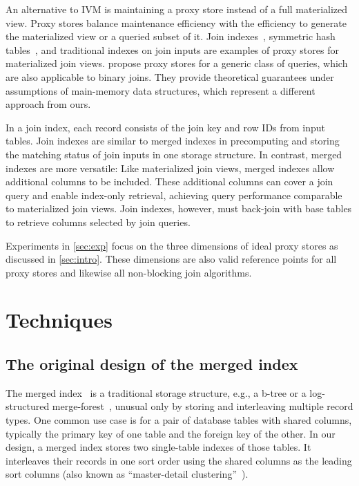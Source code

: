\documentclass[biblatex, english]{lni}
\begin{document}
An alternative to IVM is maintaining a proxy store instead of a full materialized view.
Proxy stores balance maintenance efficiency with the efficiency to generate the materialized view or a queried subset of it.
Join indexes~\cite{oneil1995joinindex,valduriez87joinindex}, symmetric hash tables~\cite{wilschut1991shj, hong1993shj, Urhan2000XJoinAR, lawrence2005early}, and traditional indexes on join inputs are examples of proxy stores for materialized join views.
 propose proxy stores for a generic class of queries, which are also applicable to binary joins.
They provide theoretical guarantees under assumptions of main-memory data structures, which represent a different approach from ours.

In a join index, each record consists of the join key and row IDs from input tables.
Join indexes are similar to merged indexes in precomputing and storing the matching status of join inputs in one storage structure.
In contrast, merged indexes are more versatile:
Like materialized join views, merged indexes allow additional columns to be included.
These additional columns can cover a join query and enable index-only retrieval, achieving query performance comparable to materialized join views.
Join indexes, however, must back-join with base tables to retrieve columns selected by join queries.

Experiments in \cref{sec:exp} focus on the three dimensions of ideal proxy stores as discussed in \cref{sec:intro}.
These dimensions are also valid reference points for all proxy stores and likewise all non-blocking join algorithms.

\section{Techniques}\label{sec:techniques}

\subsection{The original design of the merged index}\label{ssec:merged-index-design}

The merged index~\cite{graefe2007merged} is a traditional storage structure, e.g., a b-tree or a log-structured merge-forest~\cite{Jagadish1997LSM,ONeil1996LSMTree}, unusual only by storing and interleaving multiple record types.
One common use case is for a pair of database tables with shared columns, typically the primary key of one table and the foreign key of the other.
In our design, a merged index stores two single-table indexes of those tables.
It interleaves their records in one sort order using the shared columns as the leading sort columns (also known as ``master-detail clustering''~\cite{graefe2007merged}).
\end{document}
